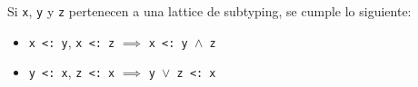 \begin{teo} \label{teo1} \normalfont Si \texttt{x}, \texttt{y} y \texttt{z} pertenecen a una lattice de subtyping, se cumple lo siguiente: \\
  \begin{itemize}
    \item \texttt{x <: y}, \texttt{x <: z} $\implies$ \texttt{x <: y }$\wedge$\texttt{ z}
    \item \texttt{y <: x}, \texttt{z <: x} $\implies$ \texttt{y }$\vee$\texttt{ z <: x}
  \end{itemize}
\end{teo}

